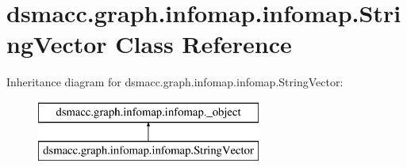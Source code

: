\hypertarget{classdsmacc_1_1graph_1_1infomap_1_1infomap_1_1StringVector}{}\section{dsmacc.\+graph.\+infomap.\+infomap.\+String\+Vector Class Reference}
\label{classdsmacc_1_1graph_1_1infomap_1_1infomap_1_1StringVector}
Inheritance diagram for dsmacc.\+graph.\+infomap.\+infomap.\+String\+Vector\+:\begin{figure}[H]
\begin{center}
\leavevmode
\includegraphics[height=2.000000cm]{classdsmacc_1_1graph_1_1infomap_1_1infomap_1_1StringVector}
\end{center}
\end{figure}
